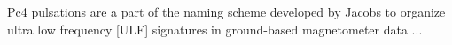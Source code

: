 
Pc4 pulsations are a part of the naming scheme developed by Jacobs to
organize ultra low frequency [ULF] signatures in ground-based
magnetometer data ...
